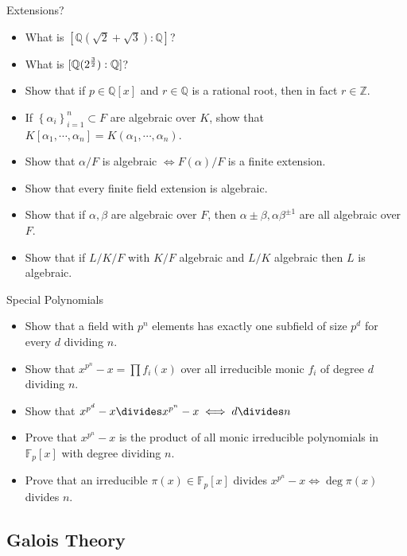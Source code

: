 Extensions?

\begin{itemize}
\tightlist
\item
  What is \([{\mathbb{Q}}(\sqrt 2 + \sqrt 3): {\mathbb{Q}}]\)?
\item
  What is \([{\mathbb{Q}}(2^{3\over 2}) : {\mathbb{Q}}]\)?
\item
  Show that if \(p\in {\mathbb{Q}}[x]\) and \(r\in {\mathbb{Q}}\) is a
  rational root, then in fact \(r\in {\mathbb{Z}}\).
\item
  If \(\left\{{\alpha_i}\right\}_{i=1}^n \subset F\) are algebraic over
  \(K\), show that
  \(K[\alpha_1, \cdots, \alpha_n] = K(\alpha_1, \cdots, \alpha_n)\).
\item
  Show that \(\alpha/F\) is algebraic \(\iff F(\alpha)/F\) is a finite
  extension.
\item
  Show that every finite field extension is algebraic.
\item
  Show that if \(\alpha, \beta\) are algebraic over \(F\), then
  \(\alpha\pm \beta, \alpha\beta^{\pm 1}\) are all algebraic over \(F\).
\item
  Show that if \(L/K/F\) with \(K/F\) algebraic and \(L/K\) algebraic
  then \(L\) is algebraic.
\end{itemize}

Special Polynomials

\begin{itemize}
\tightlist
\item
  Show that a field with \(p^n\) elements has exactly one subfield of
  size \(p^d\) for every \(d\) dividing \(n\).
\item
  Show that \(x^{p^n} - x = \prod f_i(x)\) over all irreducible monic
  \(f_i\) of degree \(d\) dividing \(n\).
\item
  Show that \(x^{p^d} - x \divides x^{p^n} - x \iff d \divides n\)
\item
  Prove that \(x^{p^n}-x\) is the product of all monic irreducible
  polynomials in \({\mathbb{F}}_p[x]\) with degree dividing \(n\).
\item
  Prove that an irreducible \(\pi(x)\in {\mathbb{F}}_p[x]\) divides
  \(x^{p^n}-x \iff \deg \pi(x)\) divides \(n\).
\end{itemize}

\hypertarget{galois-theory-2}{%
\subsection{Galois Theory}\label{galois-theory-2}}

